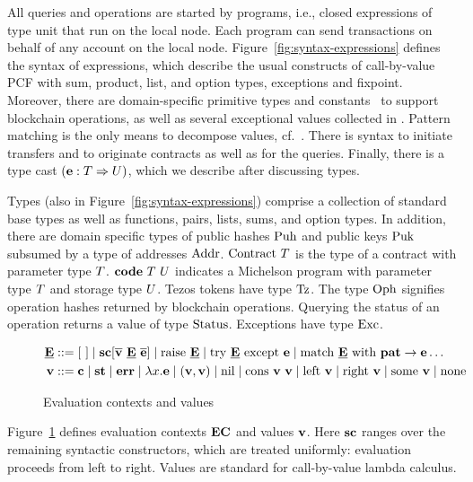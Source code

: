 \documentclass[a4paper]{llncs}
\begin{document}
All queries and operations are started by programs, i.e., closed
expressions of type unit that run on the
local node. Each program can send transactions on behalf of any
account on the local node.  Figure~\ref{fig:syntax-expressions} defines the syntax of
expressions, which describe the usual constructs of call-by-value PCF
with sum, product, list, and option types, exceptions and fixpoint. Moreover, there are
domain-specific primitive types and constants \CONSTANT\ to support blockchain
operations, as well as several exceptional values collected in \ERROR.
Pattern matching is the only means to decompose values, cf.\ \PATTERN.
There is syntax to initiate transfers and to originate contracts as
well as for the queries. Finally, there is a type cast
$(\textbf{e} : T \Rightarrow U)$, which we describe after discussing types.

Types (also in Figure~\ref{fig:syntax-expressions}) comprise a
collection of standard base types as well as 
functions, pairs, lists, sums, and option types. In addition, there
are domain specific types of public hashes $\text{Puh}$ and public keys $\text{Puk}$ subsumed by
a type of addresses $\text{Addr}$. $\text{Contract}\ T$ is the type of
a contract with parameter type $T$. $\textbf{code}\ T\ U$
indicates a Michelson program with parameter type $T$ and storage
type $U$. Tezos tokens have type $\text{Tz}$. The type $\text{Oph}$ signifies operation hashes
returned by blockchain operations. Querying the status of an operation
returns a value of type $\text{Status}$. Exceptions have type
$\text{Exc}$. 

\begin{figure}[tp]
\begin{align*}
  \ECN{} & :: = \ECHOLE \mid \SC[\overline\VAL\ \ECN{}\ \overline\EXPR] \mid \RAISE\ \ECN{} \mid \TRY\ \ECN{}\ \EXCEPT\ \EXPR
  \mid \MATCH\ \ECN{}\ \WITH\ \PATTERN\to\EXPR \dots
  \\
  \VAL & ::= \CONSTANT \mid \STATUS \mid \ERROR \mid \lambda x.\EXPR \mid(\VAL, \VAL) \mid
         \NIL \mid \CONS\ \VAL\ \VAL \mid \LEFT\ \VAL \mid \RIGHT\
         \VAL \mid \SOME\ \VAL\mid \NONE
\end{align*}
  \caption{Evaluation contexts and values}
  \label{fig:evaluation-contexts-values}
\end{figure}
Figure~\ref{fig:evaluation-contexts-values} defines evaluation
contexts $\textbf{EC}$ and values $\textbf{v}$.
Here $\textbf{sc}$ ranges over the remaining syntactic constructors, which are
treated uniformly: evaluation proceeds from left to right. Values are
standard for call-by-value lambda calculus.
\end{document}
